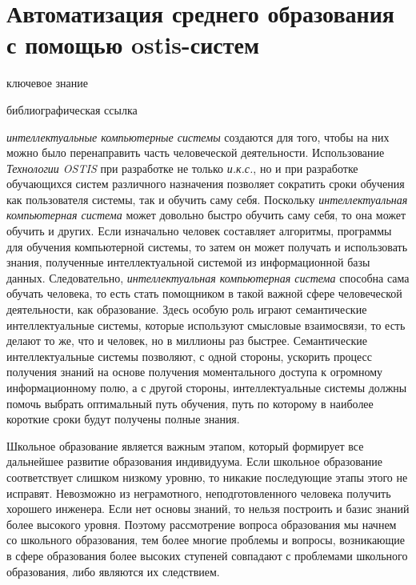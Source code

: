 \section{Автоматизация среднего образования с помощью ostis-систем}
\label{sec_automation_secondary_education}

\begin{SCn}
	
	\bigskip
	
	\begin{scnrelfromlist}{ключевое знание}
	\end{scnrelfromlist}
	
	\bigskip
	
	\begin{scnrelfromlist}{библиографическая ссылка}
	\end{scnrelfromlist}
	
\end{SCn}

\textit{интеллектуальные компьютерные системы} создаются для того, чтобы на них можно было перенаправить часть человеческой деятельности. Использование \textit{Технологии OSTIS} при разработке не только \textit{и.к.с.}, но и при разработке обучающихся систем различного назначения позволяет сократить сроки обучения как пользователя системы, так и обучить саму себя. Поскольку \textit{интеллектуальная компьютерная система} может довольно быстро обучить саму себя, то она может обучить и других. Если изначально человек составляет алгоритмы, программы для обучения компьютерной системы, то затем он может получать и использовать знания, полученные интеллектуальной системой из информационной базы данных. Следовательно, \textit{интеллектуальная компьютерная система} способна сама обучать человека, то есть стать помощником в такой важной сфере человеческой деятельности, как образование. Здесь особую роль играют семантические интеллектуальные системы, которые используют смысловые взаимосвязи, то есть делают то же, что и человек, но в миллионы раз быстрее. Семантические интеллектуальные системы позволяют, с одной стороны, ускорить процесс получения знаний на основе получения моментального доступа к огромному информационному полю, а с другой стороны, интеллектуальные системы должны помочь выбрать оптимальный путь обучения, путь по которому в наиболее короткие сроки будут получены полные знания.

Школьное образование является важным этапом, который формирует все дальнейшее развитие образования индивидуума. Если школьное образование соответствует слишком низкому уровню, то никакие последующие этапы этого не исправят. Невозможно из неграмотного, неподготовленного человека получить хорошего инженера. Если нет основы знаний, то нельзя построить и базис знаний более высокого уровня. Поэтому рассмотрение вопроса образования мы начнем со школьного образования, тем более многие проблемы и вопросы, возникающие в сфере образования более высоких ступеней совпадают с проблемами школьного образования, либо являются их следствием.

